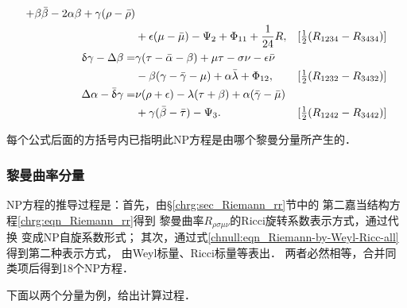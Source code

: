 \begin{small}
\begin{subequations}
\begin{align}
        +\beta \bar{\beta }-2\alpha \beta +\gamma (\rho -\bar{\rho }) & \notag \\
        & +\epsilon (\mu -\bar{\mu })-\Psi _{2} + \Phi_{11} +\frac{1}{24}R,
        &[\tfrac{1}{2}(R_{1234}-R_{3434})] \label{chnull:eqn_NP-all-R1234-3434} \\
        \updelta \gamma -\Delta \beta =& \gamma (\tau -\bar{\alpha }-\beta )+\mu \tau -\sigma \nu
        -\epsilon \bar{\nu } \notag \\
        &-\beta (\gamma -\bar{\gamma } -\mu )  +\alpha \bar{\lambda } + \Phi_{12},
        & [\tfrac{1}{2}(R_{1232}-R_{3432})]  \label{chnull:eqn_NP-all-R1232-3432} \\
        \Delta \alpha -\bar{\updelta }\gamma =&\nu (\rho +\epsilon )-\lambda (\tau +\beta )
        +\alpha (\bar{\gamma }-\bar{\mu }) \notag \\
        &+\gamma (\bar{ \beta }-\bar{\tau })-\Psi _{3}.
        & [\tfrac{1}{2}(R_{1242}-R_{3442})] \label{chnull:eqn_NP-all-R1242-3442}
    \end{align}
\end{subequations} \setlength{\mathindent}{2em} 
\end{small}
每个公式后面的方括号内已指明此NP方程是由哪个黎曼分量所产生的．

\subsubsection{黎曼曲率分量}
NP方程的推导过程是：首先，由\S\ref{chrg:sec_Riemann_rr}节中的
第二嘉当结构方程\eqref{chrg:eqn_Riemann_rr}得到
黎曼曲率$R_{\rho\sigma\mu\nu}$的Ricci旋转系数表示方式，通过代换
变成NP自旋系数形式；
其次，通过式\eqref{chnull:eqn_Riemann-by-Weyl-Ricc-all}得到第二种表示方式，
由Weyl标量、Ricci标量等表出．
两者必然相等，合并同类项后得到18个NP方程．

下面以两个分量为例，给出计算过程．

